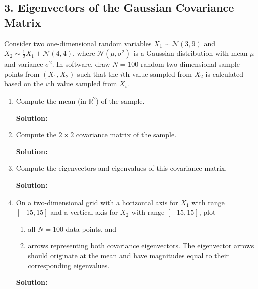 \documentclass{article}
\newcommand{\solution}{\textbf{Solution: }}
\renewcommand{\N}{\mathcal{N}}
\renewcommand{\R}{\mathbb{R}}
\begin{document}
\subsection*{3. Eigenvectors of the Gaussian Covariance Matrix}
Consider two one-dimensional random variables $X_1 \sim \N(3, 9)$ and $X_2 \sim \frac{1}{2}X_1 + \N(4, 4)$, where $\N(\mu, \sigma^2)$  is a Gaussian distribution with mean $\mu$ and variance $\sigma^2$. In software, draw $N = 100$ random two-dimensional sample points from $(X_1, X_2)$ such that the $i$th value sampled from $X_2$ is calculated based on the $i$th value sampled from $X_i$.
\begin{enumerate}[label=(\alph*)]
    \item Compute the mean (in $\R^2$) of the sample.
    \begin{mdframed} \solution
    \end{mdframed}

    \item Compute the $2 \times 2$ covariance matrix of the sample.
    \begin{mdframed} \solution
    \end{mdframed}

    \item Compute the eigenvectors and eigenvalues of this covariance matrix.
    \begin{mdframed} \solution
    \end{mdframed}

    \item On a two-dimensional grid with a horizontal axis for $X_1$ with range $[-15, 15]$ and a vertical axis for $X_2$ with range $[-15, 15]$, plot
    \begin{enumerate}[label=(\roman*)]
        \item all $N=100$ data points, and
        \item arrows representing both covariance eigenvectors. The eigenvector arrows should originate at the mean and have magnitudes equal to their corresponding eigenvalues.
    \end{enumerate}
    \begin{mdframed} \solution
    \end{mdframed}


\end{enumerate}
\end{document}
